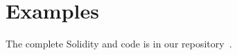 \documentclass[nonacm, dvipsnames, sigconf]{acmart}
\begin{document}
\section{Examples}
The complete Solidity and \langName code is in our repository~\cite{psamatheRepo}.
%         
%         
%         
%         
\end{document}
